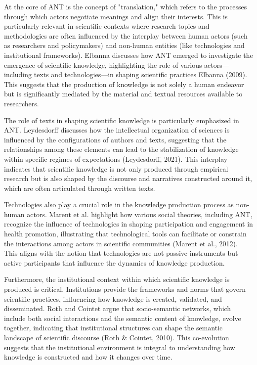 \documentclass[12pt]{article}
\begin{document}
At the core of ANT is the concept of "translation," which refers to the processes through which actors negotiate meanings and align their interests. This is particularly relevant in scientific contexts where research topics and methodologies are often influenced by the interplay between human actors (such as researchers and policymakers) and non-human entities (like technologies and institutional frameworks). Elbanna discusses how ANT emerged to investigate the emergence of scientific knowledge, highlighting the role of various actors—including texts and technologies—in shaping scientific practices Elbanna (2009). This suggests that the production of knowledge is not solely a human endeavor but is significantly mediated by the material and textual resources available to researchers.

The role of texts in shaping scientific knowledge is particularly emphasized in ANT. Leydesdorff discusses how the intellectual organization of sciences is influenced by the configurations of authors and texts, suggesting that the relationships among these elements can lead to the stabilization of knowledge within specific regimes of expectations (Leydesdorff, 2021). This interplay indicates that scientific knowledge is not only produced through empirical research but is also shaped by the discourse and narratives constructed around it, which are often articulated through written texts.

Technologies also play a crucial role in the knowledge production process as non-human actors. Marent et al. highlight how various social theories, including ANT, recognize the influence of technologies in shaping participation and engagement in health promotion, illustrating that technological tools can facilitate or constrain the interactions among actors in scientific communities (Marent et al., 2012). This aligns with the notion that technologies are not passive instruments but active participants that influence the dynamics of knowledge production.

Furthermore, the institutional context within which scientific knowledge is produced is critical. Institutions provide the frameworks and norms that govern scientific practices, influencing how knowledge is created, validated, and disseminated. Roth and Cointet argue that socio-semantic networks, which include both social interactions and the semantic content of knowledge, evolve together, indicating that institutional structures can shape the semantic landscape of scientific discourse (Roth \& Cointet, 2010). This co-evolution suggests that the institutional environment is integral to understanding how knowledge is constructed and how it changes over time.
\end{document}
